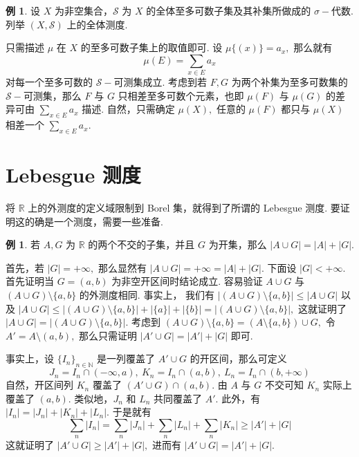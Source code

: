 \documentclass[12pt, a4paper, oneside]{book}
\numberwithin{figure}{section}
\theoremstyle{definition}
\newtheorem{example}[theorem]{例}
\begin{document}
\begin{example}
    设 $X$ 为非空集合，$\mathcal S$ 为 $X$ 的全体至多可数子集及其补集所做成的 $\sigma-$代数. 列举 $(X,\mathcal S)$ 上的全体测度.
\end{example}
只需描述 $\mu$ 在 $X$ 的至多可数子集上的取值即可. 设 $\mu\{(x)\}=a_x,$ 那么就有
\begin{equation}
    \mu(E)=\sum_{x\in E}a_x
\end{equation}
对每一个至多可数的 $\mathcal S-$可测集成立. 考虑到若 $F,G$ 为两个补集为至多可数集的 $\mathcal S-$可测集，那么 $F$ 与 $G$ 只相差至多可数个元素，也即 $\mu(F)$ 与 $\mu(G)$ 的差异可由 $\sum_{x\in E}a_x$ 描述. 
自然，只需确定 $\mu(X),$ 任意的 $\mu(F)$ 都只与 $\mu(X)$ 相差一个 $\sum_{x\in E}a_x.$ 

\section{Lebesgue 测度}

将 $\mathbb R$ 上的外测度的定义域限制到 Borel 集，就得到了所谓的 Lebesgue 测度. 要证明这的确是一个测度，需要一些准备. 

\begin{example}\label{additivity of outer measure if one of the sets is open}
    若 $A,G$ 为 $\mathbb R$ 的两个不交的子集，并且 $G$ 为开集，那么 $|A\cup G|=|A|+|G|.$
\end{example}
首先，若 $|G|=+\infty,$ 那么显然有 $|A\cup G|=+\infty=|A|+|G|.$ 下面设 $|G|<+\infty.$
首先证明当 $G=(a,b)$ 为非空开区间时结论成立. 容易验证 $A\cup G$ 与 $(A\cup G)\setminus\{a,b\}$ 的外测度相同. 事实上，
我们有 $|(A\cup G)\setminus\{a,b\}|\leq |A\cup G|$ 以及 $|A\cup G|\leq |(A\cup G)\setminus\{a,b\}|+|\{a\}|+|\{b\}|=|(A\cup G)\setminus\{a,b\}|,$ 这就证明了 $|A\cup G|=|(A\cup G)\setminus\{a,b\}|.$ 
考虑到 $(A\cup G)\setminus\{a,b\}=(A\setminus\{a,b\})\cup G,$ 令 $A'=A\setminus(a,b),$ 那么只需证明 $|A'\cup G|=|A'|+|G|$ 即可.

事实上，设 $\{I_n\}_{n\in\mathbb N}$ 是一列覆盖了 $A'\cup G$ 的开区间，那么可定义 
\begin{equation}
    J_n=I_n\cap (-\infty,a),\ K_n=I_n\cap (a,b),\ L_n=I_n\cap (b,+\infty)
\end{equation}
自然，开区间列 $K_n$ 覆盖了 $(A'\cup G)\cap (a,b).$ 由 $A$ 与 $G$ 不交可知 $K_n$ 实际上覆盖了 $(a,b).$ 类似地，$J_n$ 和 $L_n$ 共同覆盖了 $A'.$ 此外，有 
$|I_n|=|J_n|+|K_n|+|L_n|.$ 于是就有
\begin{equation}
    \sum_n |I_n|=\sum_n |J_n|+\sum_n |L_n|+\sum_n |K_n|\geq |A'|+|G|
\end{equation}
这就证明了 $|A'\cup G|\geq |A'|+|G|,$ 进而有 $|A'\cup G|=|A'|+|G|.$
\end{document}
